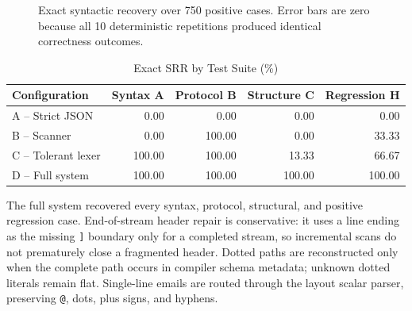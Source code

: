 \documentclass[conference]{IEEEtran}
\begin{document}
\begin{figure}[t]
\centering
{}
\caption{Exact syntactic recovery over 750 positive cases. Error bars are
zero because all 10 deterministic repetitions produced identical
correctness outcomes.}
\label{fig:ablation}
\end{figure}

\begin{table}[h]
\centering
\caption{Exact SRR by Test Suite (\%)}
\begin{tabular}{@{}lrrrr@{}}
\toprule
Configuration & Syntax A & Protocol B & Structure C & Regression H \\
\midrule
A -- Strict JSON & 0.00 & 0.00 & 0.00 & 0.00 \\
B -- Scanner & 0.00 & 100.00 & 0.00 & 33.33 \\
C -- Tolerant lexer & 100.00 & 100.00 & 13.33 & 66.67 \\
D -- Full system & 100.00 & 100.00 & 100.00 & 100.00 \\
\bottomrule
\end{tabular}
\end{table}

The full system recovered every syntax, protocol, structural, and positive
regression case. End-of-stream header repair is conservative: it uses a line
ending as the missing \texttt{]} boundary only for a completed stream, so
incremental scans do not prematurely close a fragmented header. Dotted
paths are reconstructed only when the complete path occurs in compiler
schema metadata; unknown dotted literals remain flat. Single-line emails
are routed through the layout scalar parser, preserving \texttt{@}, dots,
plus signs, and hyphens.
\end{document}
